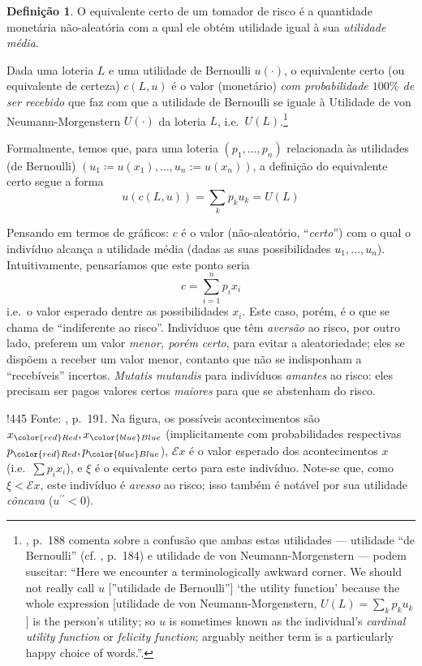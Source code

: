 \documentclass[12pt]{article}
\numberwithin{equation}{section}
\theoremstyle{plain}
\theoremstyle{definition}
\newtheorem{definition}[theorem]{Definição}
\theoremstyle{remark}
\begin{document}
\begin{definition}
O equivalente certo de um tomador de risco é a quantidade monetária
não-aleatória com a qual ele obtém utilidade igual à sua
\textit{utilidade média}.

Dada uma loteria \(L\) e uma utilidade de Bernoulli \(u(\cdot)\), o
equivalente certo (ou equivalente de certeza) \(c(L, u)\) é o valor
(monetário) \textit{com probabilidade \(100\%\) de ser recebido} que faz
com que a utilidade de Bernoulli se iguale à Utilidade de von
Neumann-Morgenstern \(U(\cdot)\) da loteria \(L\),
i.e.~\(U(L)\).\footnote{\textcite{Cowell2004}, p.~188 comenta sobre a
  confusão que ambas estas utilidades --- utilidade ``de Bernoulli''
  (cf. \textcite{Mas-Colell1995}, p.~184) e utilidade de von
  Neumann-Morgenstern --- podem suscitar: ``Here we encounter a
  terminologically awkward corner. We should not really call \(u\)
  {[}''utilidade de Bernoulli''{]} `the utility function' because the
  whole expression {[}utilidade de von Neumann-Morgenstern,
  \(U(L) = \sum \limits_{k} p_{k} u_{k}\){]} is the person's utility; so
  \(u\) is sometimes known as the individual's \textit{cardinal utility
  function} or \textit{felicity function}; arguably neither term is a
  particularly happy choice of words.''.}

Formalmente, temos que, para uma loteria \((p_{1}, \dots, p_{n})\)
relacionada às utilidades (de Bernoulli)
\((u_{1} \coloneqq u(x_{1}), \dots, u_{n}:= u(x_{n}))\), a definição do
equivalente certo segue a forma
\[
u(c(L, u)) = \sum \limits_{k} p_{k} u_{k} = U(L)
\]

Pensando em termos de gráficos: \(c\) é o valor (não-aleatório,
``\textit{certo}'') com o qual o indivíduo alcança a utilidade média
(dadas as suas possibilidades \(u_{1},\dots, u_{n}\)). Intuitivamente,
pensaríamos que este ponto seria
\[
c = \sum \limits_{i=1}^{n} p_{i} x_{i}
\]
i.e.~o valor esperado dentre as possibilidades \(x_{i}\). Este caso,
porém, é o que se chama de ``indiferente ao risco''. Indivíduos que têm
\textit{aversão} ao risco, por outro lado, preferem um valor
\textit{menor, porém certo}, para evitar a aleatoriedade; eles se
dispõem a receber um valor menor, contanto que não se indisponham a
``recebíveis'' incertos. \textit{Mutatis mutandis} para indivíduos
\textit{amantes} ao risco: eles precisam ser pagos valores certos
\textit{maiores} para que se abstenham do risco.

!445 Fonte: \textcite{Cowell2004}, p.~191. Na figura, os possíveis
acontecimentos são \(x_{\color{red} Red}, x_{\color{blue} Blue}\)
(implicitamente com probabilidades respectivas
\(p_{\color{red} Red}, p_{\color{blue} Blue}\)), \(\mathcal{E}x\) é o
valor esperado dos acontecimentos \(x\) (i.e.~\(\sum p_{i}x_{i}\)), e
\(\xi\) é o equivalente certo para este indivíduo. Note-se que, como
\(\xi < \mathcal{E}x\), este indivíduo é \textit{avesso} ao risco; isso
também é notável por sua utilidade \textit{côncava}
(\(u^{\prime\prime}<0\)).
\end{definition}
\end{document}
